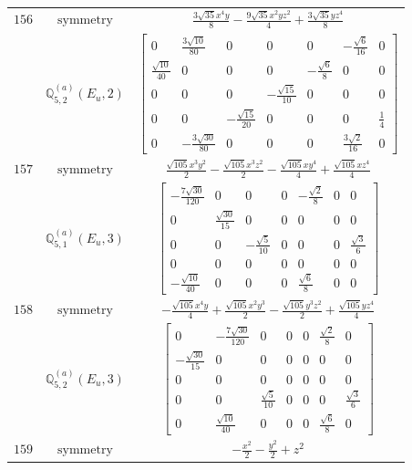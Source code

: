 \documentclass[fleqn,8pt,landscape]{jsarticle}
\begin{document}
\begin{longtable}{ccc}
$ 156 $ & $ \text{symmetry} $ & $ \frac{3 \sqrt{35} x^{4} y}{8} - \frac{9 \sqrt{35} x^{2} y z^{2}}{4} + \frac{3 \sqrt{35} y z^{4}}{8} $ \\
$  $ & $ \mathbb{Q}_{5,2}^{(a)}(E_{u},2) $ & $ \begin{bmatrix} 0 & \frac{3 \sqrt{10}}{80} & 0 & 0 & 0 & - \frac{\sqrt{6}}{16} & 0 \\ \frac{\sqrt{10}}{40} & 0 & 0 & 0 & - \frac{\sqrt{6}}{8} & 0 & 0 \\ 0 & 0 & 0 & - \frac{\sqrt{15}}{10} & 0 & 0 & 0 \\ 0 & 0 & - \frac{\sqrt{15}}{20} & 0 & 0 & 0 & \frac{1}{4} \\ 0 & - \frac{3 \sqrt{30}}{80} & 0 & 0 & 0 & \frac{3 \sqrt{2}}{16} & 0 \end{bmatrix} $ \\ \hline
$ 157 $ & $ \text{symmetry} $ & $ \frac{\sqrt{105} x^{3} y^{2}}{2} - \frac{\sqrt{105} x^{3} z^{2}}{2} - \frac{\sqrt{105} x y^{4}}{4} + \frac{\sqrt{105} x z^{4}}{4} $ \\
$  $ & $ \mathbb{Q}_{5,1}^{(a)}(E_{u},3) $ & $ \begin{bmatrix} - \frac{7 \sqrt{30}}{120} & 0 & 0 & 0 & - \frac{\sqrt{2}}{8} & 0 & 0 \\ 0 & \frac{\sqrt{30}}{15} & 0 & 0 & 0 & 0 & 0 \\ 0 & 0 & - \frac{\sqrt{5}}{10} & 0 & 0 & 0 & \frac{\sqrt{3}}{6} \\ 0 & 0 & 0 & 0 & 0 & 0 & 0 \\ - \frac{\sqrt{10}}{40} & 0 & 0 & 0 & \frac{\sqrt{6}}{8} & 0 & 0 \end{bmatrix} $ \\ \hline
$ 158 $ & $ \text{symmetry} $ & $ - \frac{\sqrt{105} x^{4} y}{4} + \frac{\sqrt{105} x^{2} y^{3}}{2} - \frac{\sqrt{105} y^{3} z^{2}}{2} + \frac{\sqrt{105} y z^{4}}{4} $ \\
$  $ & $ \mathbb{Q}_{5,2}^{(a)}(E_{u},3) $ & $ \begin{bmatrix} 0 & - \frac{7 \sqrt{30}}{120} & 0 & 0 & 0 & \frac{\sqrt{2}}{8} & 0 \\ - \frac{\sqrt{30}}{15} & 0 & 0 & 0 & 0 & 0 & 0 \\ 0 & 0 & 0 & 0 & 0 & 0 & 0 \\ 0 & 0 & \frac{\sqrt{5}}{10} & 0 & 0 & 0 & \frac{\sqrt{3}}{6} \\ 0 & \frac{\sqrt{10}}{40} & 0 & 0 & 0 & \frac{\sqrt{6}}{8} & 0 \end{bmatrix} $ \\ \hline
$ 159 $ & $ \text{symmetry} $ & $ - \frac{x^{2}}{2} - \frac{y^{2}}{2} + z^{2} $ \\

\end{longtable}
\end{document}
